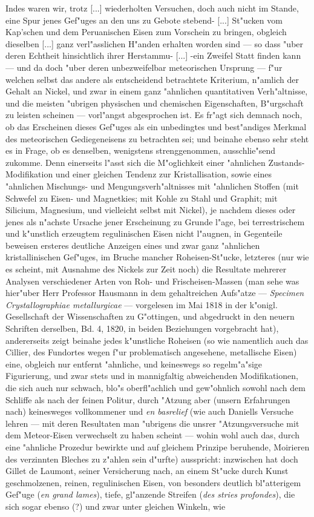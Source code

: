 \documentclass[a4paper, 11pt, oneside, german]{article}
\begin{document}
Indes waren wir, trotz [...] wiederholten Versuchen, doch auch nicht im Stande, eine Spur jenes Gef"uges an den uns zu Gebote stebend- [...] St"ucken vom Kap'schen und dem Peruanischen Eisen zum Vorschein zu bringen, obgleich dieselben [...] ganz verl"asslichen H"anden erhalten worden sind --- so dass "uber deren Echtheit hinsichtlich ihrer Herstammu- [...] -ein Zweifel Statt finden kann --- und da doch "uber deren unbezweifelbar meteorischen Ursprung --- f"ur welchen selbst das andere als entscheidend betrachtete Kriterium, n"amlich der Gehalt an Nickel, und zwar in einem ganz "ahnlichen quantitativen Verh"altnisse, und die meisten "ubrigen physischen und chemischen Eigenschaften, B"urgschaft zu leisten scheinen --- vorl"angst abgesprochen ist. Es fr"agt sich demnach noch, ob das Erscheinen dieses Gef"uges als ein unbedingtes und best"andiges Merkmal des meteorischen Gediegeneisens zu betrachten sei; und beinahe ebenso sehr steht es in Frage, ob es denselben, wenigstens strenggenommen, ausschlie"send zukomme. Denn einerseits l"asst sich die M"oglichkeit einer "ahnlichen Zustands-Modifikation und einer gleichen Tendenz zur Kristallisation, sowie eines "ahnlichen Mischungs- und Mengungsverh"altnisses mit "ahnlichen Stoffen (mit Schwefel zu Eisen- und Magnetkies; mit Kohle zu Stahl und Graphit; mit Silicium, Magnesium, und vielleicht selbst mit Nickel), je nachdem dieses oder jenes als n"achste Ursache jener Erscheinung zu Grunde l"age, bei terrestrischem und k"unstlich erzeugtem regulinischen Eisen nicht l"augnen, in Gegenteile beweisen ersteres deutliche Anzeigen eines und zwar ganz "ahnlichen kristallinischen Gef"uges, im Bruche mancher Roheisen-St"ucke, letzteres (nur wie es scheint, mit Ausnahme des Nickels zur Zeit noch) die Resultate mehrerer Analysen verschiedener Arten von Roh- und Frischeisen-Massen (man sehe was hier"uber Herr Professor Hausmann in dem gehaltreichen Aufs"atze --- \emph{Specimen Crystallographiae metallurgicae} --- vorgelesen im Mai 1818 in der k"onigl. Gesellschaft der Wissenschaften zu G"ottingen, und abgedruckt in den neuern Schriften derselben, Bd. 4, 1820, in beiden Beziehungen vorgebracht hat), andererseits zeigt beinahe jedes k"unstliche Roheisen (so wie namentlich auch das Cillier, des Fundortes wegen f"ur problematisch angesehene, metallische Eisen) eine, obgleich nur entfernt "ahnliche, und keineswegs so regelm"a"sige Figurierung, und zwar stets und in mannigfaltig abweichenden Modifikationen, die sich auch nur schwach, blo"s oberfl"achlich und gew"ohnlich sowohl nach dem Schliffe als nach der feinen Politur, durch "Atzung aber (unsern Erfahrungen nach) keinesweges vollkommener und \emph{en basrelief} (wie auch Daniells Versuche lehren --- mit deren Resultaten man "ubrigens die unsrer "Atzungsversuche mit dem Meteor-Eisen verwechselt zu haben scheint --- wohin wohl auch das, durch eine "ahnliche Prozedur bewirkte und auf gleichem Prinzipe beruhende, Moirieren des verzinnten Bleches zu z"ahlen sein d"urfte) ausspricht: inzwischen hat doch Gillet de Laumont, seiner Versicherung nach, an einem St"ucke durch Kunst geschmolzenen, reinen, regulinischen Eisen, von besonders deutlich bl"atterigem Gef"uge (\emph{en grand lames}), tiefe, gl"anzende Streifen (\emph{des stries profondes}), die sich sogar ebenso (?) und zwar unter gleichen Winkeln, wie 
\end{document}
